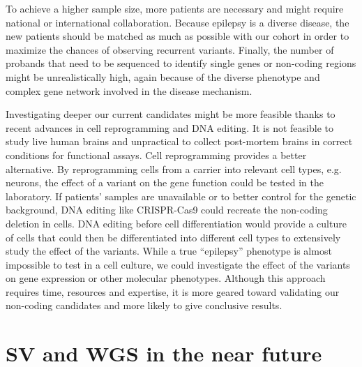 To achieve a higher sample size, more patients are necessary and might require national or international collaboration.
Because epilepsy is a diverse disease, the new patients should be matched as much as possible with our cohort in order to maximize the chances of observing recurrent variants.
Finally, the number of probands that need to be sequenced to identify single genes or non-coding regions might be unrealistically high, again because of the diverse phenotype and complex gene network involved in the disease mechanism.

Investigating deeper our current candidates might be more feasible thanks to recent advances in cell reprogramming and DNA editing.
It is not feasible to study live human brains and unpractical to collect post-mortem brains in correct conditions for functional assays.
Cell reprogramming provides a better alternative.
By reprogramming cells from a carrier into relevant cell types, e.g. neurons, the effect of a variant on the gene function could be tested in the laboratory.
If patients' samples are unavailable or to better control for the genetic background, DNA editing like CRISPR-Cas9 could recreate the non-coding deletion in cells.
DNA editing before cell differentiation would provide a culture of cells that could then be differentiated into different cell types to extensively study the effect of the variants.
While a true ``epilepsy'' phenotype is almost impossible to test in a cell culture, we could investigate the effect of the variants on gene expression or other molecular phenotypes.
Although this approach requires time, resources and expertise, it is more geared toward validating our non-coding candidates and more likely to give conclusive results.

\section*{SV and WGS in the near future}

